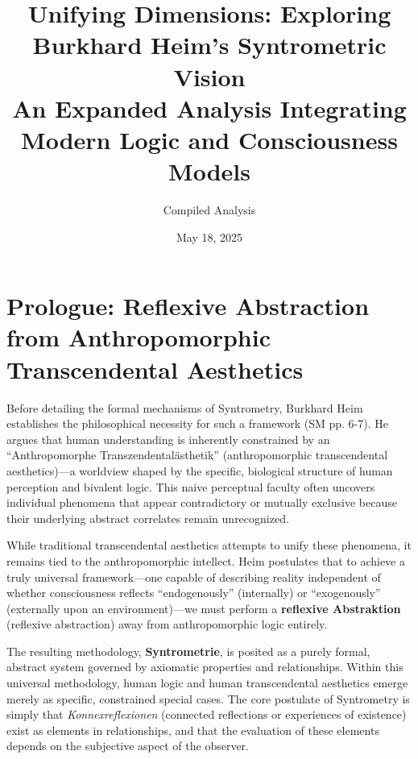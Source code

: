 \documentclass[12pt]{article}
\newcommand{\q}[1]{\enquote{#1}}
\begin{document}
\title{Unifying Dimensions: Exploring Burkhard Heim's Syntrometric Vision \\ \large An Expanded Analysis Integrating Modern Logic and Consciousness Models}
\author{Compiled Analysis}
\date{May 18, 2025}
\maketitle

\clearpage
\begin{center}
    \tableofcontents
\end{center}
\clearpage

\section*{Prologue: Reflexive Abstraction from Anthropomorphic Transcendental Aesthetics}

Before detailing the formal mechanisms of Syntrometry, Burkhard Heim establishes the philosophical necessity for such a framework (SM pp. 6-7). He argues that human understanding is inherently constrained by an \q{Anthropomorphe Transzendentalästhetik} (anthropomorphic transcendental aesthetics)—a worldview shaped by the specific, biological structure of human perception and bivalent logic. This naive perceptual faculty often uncovers individual phenomena that appear contradictory or mutually exclusive because their underlying abstract correlates remain unrecognized.

While traditional transcendental aesthetics attempts to unify these phenomena, it remains tied to the anthropomorphic intellect. Heim postulates that to achieve a truly universal framework—one capable of describing reality independent of whether consciousness reflects \q{endogenously} (internally) or \q{exogenously} (externally upon an environment)—we must perform a \textbf{reflexive Abstraktion} (reflexive abstraction) away from anthropomorphic logic entirely. 

The resulting methodology, \textbf{Syntrometrie}, is posited as a purely formal, abstract system governed by axiomatic properties and relationships. Within this universal methodology, human logic and human transcendental aesthetics emerge merely as specific, constrained special cases. The core postulate of Syntrometry is simply that \textit{Konnexreflexionen} (connected reflections or experiences of existence) exist as elements in relationships, and that the evaluation of these elements depends on the subjective aspect of the observer.
\end{document}

